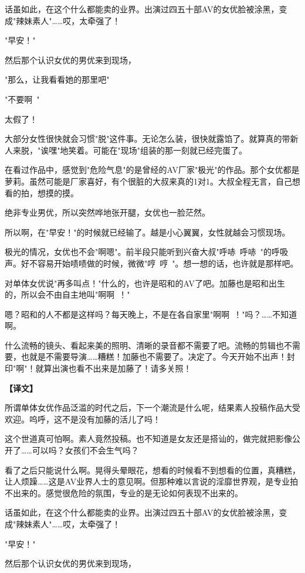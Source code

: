 \documentclass[12pt,UTF8]{ctexbook}
\begin{document}
{{话虽如此，在这个什么都能卖的业界。出演过四五十部AV的女优脸被涂黑，变成"辣妹素人"……哎，太牵强了！

"早安！"

然后那个认识女优的男优来到现场，

"那么，让我看看她的那里吧"

"不要啊~"

太假了！

大部分女性很快就会习惯"脱"这件事。无论怎么装，很快就露馅了。就算真的带新人来脱，"诶嘿"地笑着。可能在"现场"组装的那一刻就已经完蛋了。

在看过作品中，感觉到"危险气息"的是曾经的AV厂家"极光"的作品。那个女优都是萝莉。虽然可能是厂家喜好，有个很脏的大叔来真的1对1。大叔全程无言，自己想看的拍，想摸的摸。

绝非专业男优，所以突然哗地张开腿，女优也一脸茫然。

所以啊，在"早安！"的时候就已经输了。越是小心翼翼，女性就越会习惯现场。

极光的情况，女优也不会"啊嗯"。前半段只能听到兴奋大叔"呼哧~呼哧~"的呼吸声。好不容易开始啧啧做的时候，微微"哼~哼~"。想一想的话，也许就是那样吧。

对单体女优说"再多叫点！"什么的，也许是昭和的AV了吧。加藤也是昭和出生的，所以会不由自主地叫"啊啊~！"

嗯？昭和的人不都是这样吗？每天晚上，不是在各自家里"啊啊~！"吗？……不知道啊。

什么流畅的镜头、看起来美的照明、清晰的录音都不需要了吧。流畅的剪辑也不需要，也就是不需要导演……糟糕！加藤也不需要了。决定了。今天开始不出声！封印"啊"！就算出演也看不出来是加藤了！请多关照！
}

\vspace{2ex}
\parbox{0.9\linewidth}{
\textbf{【译文】}\par

所谓单体女优作品泛滥的时代之后，下一个潮流是什么呢，结果素人投稿作品大受欢迎。呜呼，这不是没有加藤的活儿了吗！

这个世道真可怕啊。素人竟然投稿。也不知道是女友还是搭讪的，做完就把影像公开了……可以吗？女孩们不会生气吗？

看了之后只能说什么啊。晃得头晕眼花，想看的时候看不到想看的位置，真糟糕，让人烦躁……这是AV业界人士的意见啊。但那种难以言说的淫靡世界观，是专业拍不出来的。感觉很危险的氛围，专业的是无论如何表现不出来的。

话虽如此，在这个什么都能卖的业界。出演过四五十部AV的女优脸被涂黑，变成"辣妹素人"……哎，太牵强了！

"早安！"

然后那个认识女优的男优来到现场，

}}
\end{document}
